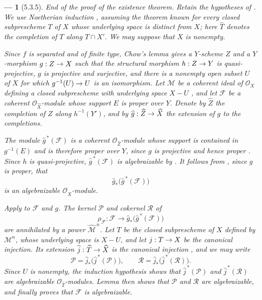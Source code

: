 \documentclass[oneside]{amsart}
\theoremstyle{ega-env-style}
\newtheorem*{env}{---}
\theoremstyle{ega-thm-env-style}
\theoremstyle{ega-defn-env-style}
\def\mathcal{\mathscr}
\def\sh{\mathcal}                   %
\renewcommand{\to}{\mathchoice{\longrightarrow}{\rightarrow}{\rightarrow}{\rightarrow}}
\newcommand{\oldpage}[2][]{{\marginnote{\normalfont{\textbf{#1}~|~#2}}}\ignorespaces}
\let\EGAOriginalLabel\label
\renewcommand{\label}[1]{\phantomsection\EGAOriginalLabel{#1}}
\begin{document}
\begin{env}[5.3.5]
\label{III.5.3.5}
\emph{End of the proof of the existence theorem.}
Retain the hypotheses of .  We use Noetherian
induction , assuming the theorem known for every
closed subprescheme $T$ of $X$ whose underlying space is distinct
from $X$; here $\widehat{T}$ denotes the completion of $T$ along
$T\cap X'$.  We may suppose that $X$ is nonempty.

Since $f$ is separated and of finite type, Chow's lemma
 gives a $Y$-scheme $Z$ and a $Y$-morphism
$g:Z\to X$ such that the structural morphism $h:Z\to Y$ is
quasi-projective, $g$ is projective and surjective, and there is a
nonempty open subset $U$ of $X$ for which
$g^{-1}(U)\to U$ is an isomorphism.  Let $\sh{M}$ be a coherent
ideal of $\sh{O}_X$ defining a closed subprescheme with underlying
space $X-U$ , and let $\sh{F}$ be a coherent
$\sh{O}_{\widehat{X}}$-module whose support $E$ is proper over $Y$.
Denote by $\widehat{Z}$ the completion of $Z$ along
$h^{-1}(Y')$, and by
$\widehat{g}:\widehat{Z}\to\widehat{X}$ the extension of $g$ to
the completions.

The module $\widehat{g}^{\,*}(\sh{F})$ is a coherent
$\sh{O}_{\widehat{Z}}$-module whose support is contained in
$g^{-1}(E)$ and is therefore proper over $Y$, since $g$ is
projective and hence proper .  Since $h$ is
quasi-projective, $\widehat{g}^{\,*}(\sh{F})$ is algebraizable by
.
\oldpage[III]{156}
It follows from , since $g$ is proper, that
\[
  \widehat{g}_*
  \bigl(\widehat{g}^{\,*}(\sh{F})\bigr)
\]
is an algebraizable $\sh{O}_{\widehat{X}}$-module.

Apply  to $\sh{F}$ and $g$.  The kernel $\sh{P}$
and cokernel $\sh{R}$ of
\[
  \rho_{\sh{F}}:
  \sh{F}\longrightarrow
  \widehat{g}_*\bigl(\widehat{g}^{\,*}(\sh{F})\bigr)
\]
are annihilated by a power $\widehat{\sh{M}}^{\,n}$.  Let $T$ be
the closed subprescheme of $X$ defined by $\sh{M}^n$, whose
underlying space is $X-U$, and let $j:T\to X$ be the canonical
injection.  Its extension
$\widehat{j}:\widehat{T}\to\widehat{X}$ is the canonical injection
, and we may write
\[
  \sh{P}=
  \widehat{j}_*\bigl(\widehat{j}^{\,*}(\sh{P})\bigr),
  \qquad
  \sh{R}=
  \widehat{j}_*\bigl(\widehat{j}^{\,*}(\sh{R})\bigr).
\]
Since $U$ is nonempty, the induction hypothesis shows that
$\widehat{j}^{\,*}(\sh{P})$ and
$\widehat{j}^{\,*}(\sh{R})$ are algebraizable
$\sh{O}_{\widehat{T}}$-modules.  Lemma  then shows
that $\sh{P}$ and $\sh{R}$ are algebraizable, and
 finally proves that $\sh{F}$ is algebraizable.
\end{env}
\end{document}
